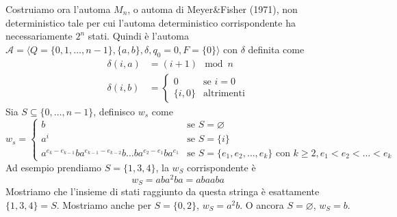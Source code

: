 \documentclass[12pt]{article}
\begin{document}
	Costruiamo ora l'automa $M_n$, o automa di Meyer\&Fisher (1971), non deterministico tale per cui l'automa deterministico corrispondente ha necessariamente $2^n$ stati.
	Quindi è l'automa $\mathcal{A} = \langle Q = \{0, 1, \dots, n - 1\}, \{a, b \}, \delta, q_0 = 0, F = \{ 0 \} \rangle$ con $\delta$ definita come
	\begin{align*}
		\delta(i, a) &= (i + 1) \mod n \\
		\delta(i, b) &= \begin{cases} 0 	& \text{se } i = 0 \\ \{i, 0\} & \text{altrimenti} \end{cases}
	\end{align*}
	Sia $S \subseteq \{0, \dots, n - 1 \}$, definisco $w_s$ come
	$$ w_s = \begin{cases} b & \text{se } S = \varnothing \\ a^i & \text{se } S = \{ i \} \\ a^{e_k - e_{k - 1}}ba^{e_{k - 1} - e_{k - 2}}b\dots ba^{e_2 - e_1}ba^{e_1} & \text{se } S = \{e_1, e_2, \dots, e_k \} \text{ con } k \geq 2, e_1 < e_2 < \dots < e_k \end{cases} $$
	Ad esempio prendiamo $S = \{1, 3, 4\}$, la $w_S$ corrispondente è
	$$w_S = aba^2ba = abaaba $$
	Mostriamo che l'insieme di stati raggiunto da questa stringa è esattamente $\{1, 3, 4\} = S$.
	Mostriamo anche per $S = \{0, 2\}$, $w_S = a^2b$.
	O ancora $S = \varnothing$, $w_S = b$.
\end{document}
